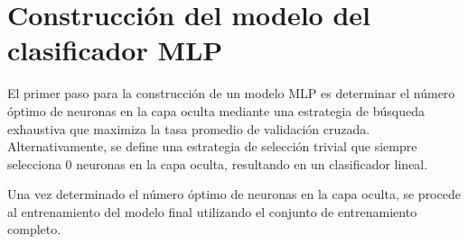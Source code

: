%
%
%
\section{Construcción del modelo del clasificador MLP}
%
El primer paso para la construcción de un modelo MLP es determinar el
número óptimo de neuronas en la capa oculta mediante una estrategia
de búsqueda exhaustiva que maximiza la tasa \GM{} promedio de
validación cruzada.
Alternativamente, se define una estrategia de selección trivial que
siempre selecciona 0 neuronas en la capa oculta, resultando en un
clasificador lineal.

Una vez determinado el número óptimo de neuronas en la capa oculta,
se procede al entrenamiento del modelo final utilizando el conjunto
de entrenamiento completo.





